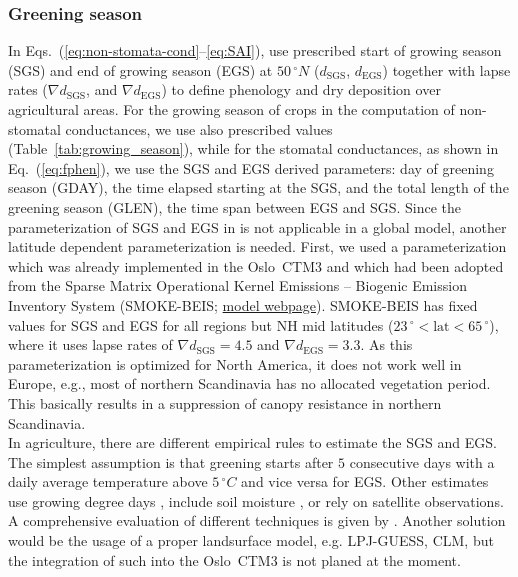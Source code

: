\documentclass[gmd, manuscript]{copernicus}
\begin{document}
\subsubsection{Greening season}
\label{subsubsec:greening}
In Eqs.~(\ref{eq:non-stomata-cond}--\ref{eq:SAI}), \citet{ACP:Simpson2012} use prescribed start of growing season (SGS) and end of growing season (EGS) at $50\,\unit{^\circ N}$ ($d_\text{SGS}$, $d_\text{EGS}$) together with lapse rates ($\nabla d_\text{SGS}$, and $\nabla d_\text{EGS}$) to define phenology and dry deposition over agricultural areas. For the growing season of crops in the computation of non-stomatal conductances, we use also prescribed values (Table~\ref{tab:growing_season}), while for the stomatal conductances, as shown in Eq.~(\ref{eq:fphen}), we use the SGS and EGS derived parameters: day of greening season (GDAY), the time elapsed starting at the SGS, and the total length of the greening season (GLEN), the time span between EGS and SGS. Since the parameterization of SGS and EGS in \citet{ACP:Simpson2012} is not applicable in a global model, another latitude dependent parameterization is needed. First, we used a parameterization which was already implemented in the Oslo~CTM3 and which had been adopted from the Sparse Matrix Operational Kernel Emissions -- Biogenic Emission Inventory System (SMOKE-BEIS; \href{https://www.epa.gov/air-emissions-modeling/biogenic-emission-inventory-system-beis}{model webpage}). SMOKE-BEIS has fixed values for SGS and EGS for all regions but NH mid latitudes ($23\,\unit{^\circ} < \text{lat} < 65\,\unit{^\circ}$), where it uses lapse rates of $\nabla d_\text{SGS} = 4.5$ and $\nabla d_\text{EGS} = 3.3$. As this parameterization is optimized for North America, it does not work well in Europe, e.g., most of northern Scandinavia has no allocated vegetation period. This basically results in a suppression of canopy resistance in northern Scandinavia.\\ 

In agriculture, there are different empirical rules to estimate the SGS and EGS. The simplest assumption is that greening starts after $5$ consecutive days with a daily average temperature above $5\,\unit{^\circ C}$ and vice versa for EGS. Other estimates use growing degree days \citep{JC:Levis2004,PO:Fu2014}, include soil moisture \citep{GCB:Fu2014}, or rely on satellite observations. A comprehensive evaluation of different techniques is given by \citet{GCB:Anav2017}. Another solution would be the usage of a proper landsurface model, e.g. LPJ-GUESS, CLM, but the integration of such into the Oslo~CTM3 is not planed at the moment.
\end{document}
